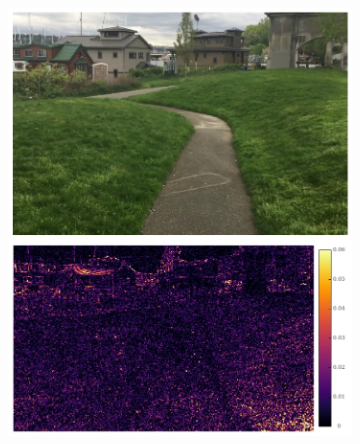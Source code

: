 \documentclass{article}
\begin{document}
\begin{figure}[h]
\centering
\begin{subfigure}{0.125\textwidth}
	\centering
    \includegraphics[width=1\linewidth]{qua_imgs/720p_240fps_1_ours.jpg}
\end{subfigure}%
\begin{subfigure}{0.125\textwidth}
	\centering

\end{subfigure}
\end{figure}
\end{document}
